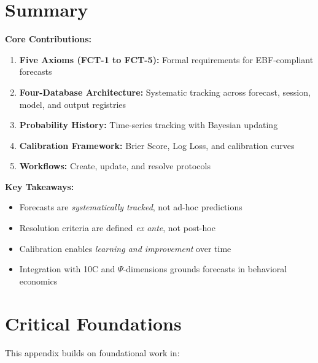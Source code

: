 \section{Summary}
\label{sec:fct-summary}

\begin{tcolorbox}[colback=blue!5!white,colframe=blue!75!black,title=Summary]
\textbf{Core Contributions:}
\begin{enumerate}
    \item \textbf{Five Axioms (FCT-1 to FCT-5):} Formal requirements for EBF-compliant forecasts
    \item \textbf{Four-Database Architecture:} Systematic tracking across forecast, session, model, and output registries
    \item \textbf{Probability History:} Time-series tracking with Bayesian updating
    \item \textbf{Calibration Framework:} Brier Score, Log Loss, and calibration curves
    \item \textbf{Workflows:} Create, update, and resolve protocols
\end{enumerate}

\textbf{Key Takeaways:}
\begin{itemize}
    \item Forecasts are \textit{systematically tracked}, not ad-hoc predictions
    \item Resolution criteria are defined \textit{ex ante}, not post-hoc
    \item Calibration enables \textit{learning and improvement} over time
    \item Integration with 10C and $\Psi$-dimensions grounds forecasts in behavioral economics
\end{itemize}
\end{tcolorbox}

\section{Critical Foundations}
\label{sec:fct-foundations}

This appendix builds on foundational work in:

